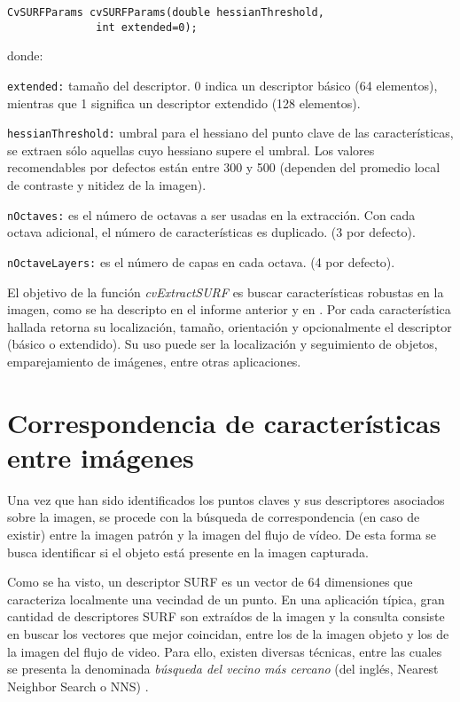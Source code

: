 \documentclass[a4paper,11pt,spanish]{article}
\begin{document}
\begin{itemize}
\begin{lstlisting}
CvSURFParams cvSURFParams(double hessianThreshold,
			  int extended=0);
\end{lstlisting}
donde:
\begin{description}
\item \texttt{extended:} tama\~no del descriptor. 0 indica un descriptor básico (64 elementos), mientras que 1 significa un descriptor extendido (128 elementos).
\item \texttt{hessianThreshold:} umbral para el hessiano del punto clave de las características, se extraen s\'olo aquellas cuyo hessiano supere el umbral.
Los valores recomendables por defectos est\'an entre 300 y 500 (dependen del promedio local de contraste y nitidez de la imagen). 
\item \texttt{nOctaves:} es el número de octavas a ser usadas en la extracción. Con cada octava adicional, el número de características es duplicado. (3 por defecto).
\item \texttt{nOctaveLayers:} es el número de capas en cada octava. (4 por defecto).
\end{description}
El objetivo de la función \emph{cvExtractSURF} es buscar características robustas en la imagen, como se ha descripto en el informe anterior y en \cite{Bay:2008:SRF}. Por cada característica hallada retorna su localización, tamaño, orientación y opcionalmente el descriptor (básico o extendido). Su uso puede ser la localización y seguimiento de objetos, emparejamiento de imágenes, entre otras aplicaciones.

\end{itemize}


\section{Correspondencia de características entre imágenes} %
Una vez que han sido identificados los puntos claves y sus descriptores asociados sobre la imagen, %
se procede con la búsqueda de correspondencia (en caso de existir) entre la imagen patrón y la imagen del flujo de vídeo. De esta forma se busca identificar si el objeto está presente en la imagen capturada. 

Como se ha visto, un descriptor SURF \cite{Bay:2008:SRF, Bay:2008:SRF} es un vector de 64 dimensiones que caracteriza localmente una vecindad de un punto. 
En una aplicación típica, gran cantidad de descriptores SURF son extraídos de la imagen y la consulta consiste en buscar los vectores que mejor coincidan, entre los de la imagen objeto y los de la imagen del flujo de video.
Para ello, existen diversas técnicas, entre las cuales se presenta la denominada \textit{búsqueda del vecino más cercano} (del ingl\'es, Nearest Neighbor Search o NNS) \cite{AryaEtAl98}.
\end{document}

